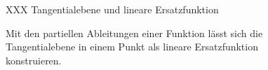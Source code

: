 %
%
%
\begin{figure}
\centering
XXX Tangentialebene und lineare Ersatzfunktion
\caption{Mit den partiellen Ableitungen einer Funktion lässt sich die
Tangentialebene in einem Punkt als lineare Ersatzfunktion konstruieren.
\label{buch:fuvar:richtungsableitung:fig:tangentialebene}}
\end{figure}

